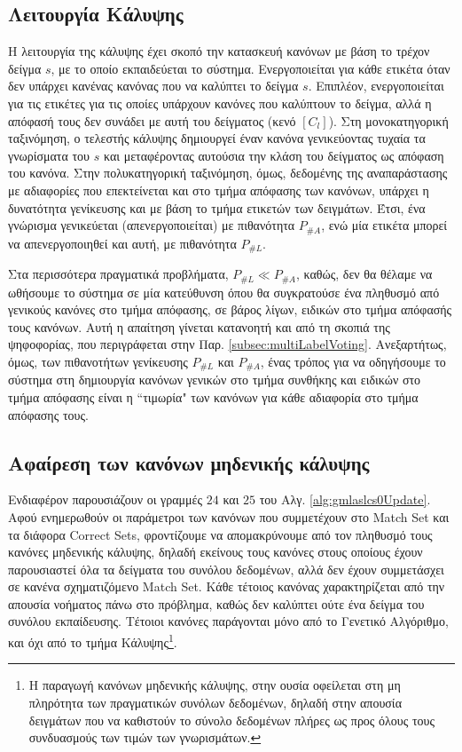 \subsection{Λειτουργία Κάλυψης}
\label{subsec:multiLabelCover}
Η λειτουργία της κάλυψης έχει σκοπό την κατασκευή κανόνων με βάση το τρέχον δείγμα $s$, με το οποίο εκπαιδεύεται το σύστημα. Ενεργοποιείται για κάθε ετικέτα όταν δεν υπάρχει κανένας κανόνας που να καλύπτει το δείγμα $s$. Επιπλέον, ενεργοποιείται για τις ετικέτες για τις οποίες υπάρχουν κανόνες που καλύπτουν το δείγμα, αλλά η απόφασή τους δεν συνάδει με αυτή του δείγματος (κενό $[C_{l}]$). Στη μονοκατηγορική ταξινόμηση, ο τελεστής κάλυψης δημιουργεί έναν κανόνα γενικεύοντας τυχαία τα γνωρίσματα του $s$ και μεταφέροντας αυτούσια την κλάση του δείγματος ως απόφαση του κανόνα. Στην πολυκατηγορική ταξινόμηση, όμως, δεδομένης της αναπαράστασης με αδιαφορίες που επεκτείνεται και στο τμήμα απόφασης των κανόνων, υπάρχει η δυνατότητα γενίκευσης και με βάση το τμήμα ετικετών των δειγμάτων. Έτσι, ένα γνώρισμα γενικεύεται (απενεργοποιείται) με πιθανότητα $P_{\#A}$, ενώ μία ετικέτα μπορεί να απενεργοποιηθεί και αυτή, με πιθανότητα $P_{\#L}$. 

Στα περισσότερα πραγματικά προβλήματα, $P_{\#L} \ll P_{\#A}$, καθώς, δεν θα θέλαμε να ωθήσουμε το σύστημα σε μία κατεύθυνση όπου θα συγκρατούσε ένα πληθυσμό από γενικούς κανόνες στο τμήμα απόφασης, σε βάρος λίγων, ειδικών στο τμήμα απόφασής τους κανόνων. Αυτή η απαίτηση γίνεται κατανοητή και από τη σκοπιά της ψηφοφορίας, που περιγράφεται στην Παρ. \ref{subsec:multiLabelVoting}. Ανεξαρτήτως, όμως, των πιθανοτήτων γενίκευσης $P_{\#L}$ και $P_{\#A}$, ένας τρόπος για να οδηγήσουμε το σύστημα στη δημιουργία κανόνων γενικών στο τμήμα συνθήκης και ειδικών στο τμήμα απόφασης είναι η “τιμωρία" των κανόνων για κάθε αδιαφορία στο τμήμα απόφασης τους. 


\subsection{Αφαίρεση των κανόνων μηδενικής κάλυψης}
Ενδιαφέρον παρουσιάζουν οι γραμμές $24$ και $25$ του Αλγ. \ref{alg:gmlaslcs0Update}. Αφού ενημερωθούν οι παράμετροι των κανόνων που συμμετέχουν στο Match Set και τα διάφορα Correct Sets, φροντίζουμε να απομακρύνουμε από τον πληθυσμό τους κανόνες μηδενικής κάλυψης, δηλαδή εκείνους τους κανόνες στους οποίους έχουν παρουσιαστεί όλα τα δείγματα του συνόλου δεδομένων, αλλά δεν έχουν συμμετάσχει σε κανένα σχηματιζόμενο Match Set. Κάθε τέτοιος κανόνας χαρακτηρίζεται από την απουσία νοήματος πάνω στο πρόβλημα, καθώς δεν καλύπτει ούτε ένα δείγμα του συνόλου εκπαίδευσης. Τέτοιοι κανόνες παράγονται μόνο από το Γενετικό Αλγόριθμο, και όχι από το τμήμα Κάλυψης\footnote{Η παραγωγή κανόνων μηδενικής κάλυψης, στην ουσία οφείλεται στη μη πληρότητα των πραγματικών συνόλων δεδομένων, δηλαδή στην απουσία δειγμάτων που να καθιστούν το σύνολο δεδομένων πλήρες ως προς όλους τους συνδυασμούς των τιμών των γνωρισμάτων.}. 

